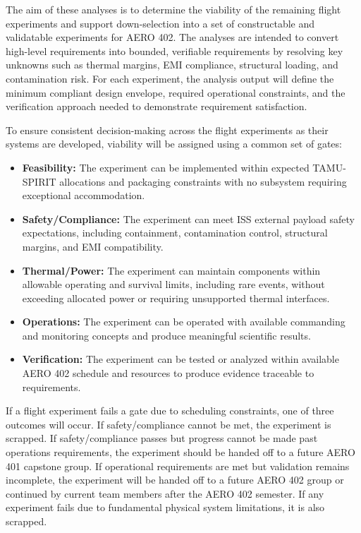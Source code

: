 \documentclass[conf]{new-aiaa}
\begin{document}
The aim of these analyses is to determine the viability of the remaining flight experiments and support down-selection into a set of constructable and validatable experiments for AERO 402. The analyses are intended to convert high-level requirements into bounded, verifiable requirements by resolving key unknowns such as thermal margins, EMI compliance, structural loading, and contamination risk. For each experiment, the analysis output will define the minimum compliant design envelope, required operational constraints, and the verification approach needed to demonstrate requirement satisfaction.

To ensure consistent decision-making across the flight experiments as their systems are developed, viability will be assigned using a common set of gates:
\begin{itemize}[leftmargin=*]
    \item \textbf{Feasibility:} The experiment can be implemented within expected TAMU-SPIRIT allocations and packaging constraints with no subsystem requiring exceptional accommodation.
    \item \textbf{Safety/Compliance:} The experiment can meet ISS external payload safety expectations, including containment, contamination control, structural margins, and EMI compatibility.
    \item \textbf{Thermal/Power:} The experiment can maintain components within allowable operating and survival limits, including rare events, without exceeding allocated power or requiring unsupported thermal interfaces.
    \item \textbf{Operations:} The experiment can be operated with available commanding and monitoring concepts and produce meaningful scientific results.
    \item \textbf{Verification:} The experiment can be tested or analyzed within available AERO 402 schedule and resources to produce evidence traceable to requirements.
\end{itemize}

If a flight experiment fails a gate due to scheduling constraints, one of three outcomes will occur. If safety/compliance cannot be met, the experiment is scrapped. If safety/compliance passes but progress cannot be made past operations requirements, the experiment should be handed off to a future AERO 401 capstone group. If operational requirements are met but validation remains incomplete, the experiment will be handed off to a future AERO 402 group or continued by current team members after the AERO 402 semester. If any experiment fails due to fundamental physical system limitations, it is also scrapped.
\end{document}
